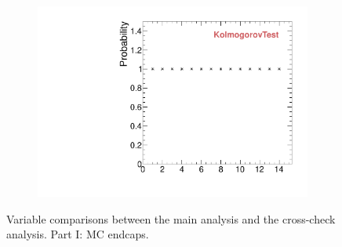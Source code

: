 \begin{figure}
\begin{subfigure}[b]{0.2\textwidth}
                \includegraphics[width=\textwidth]{Figures/VariablesComparison/MC_endcaps_figs/KS}
                \label{fig:MC_endcaps_KS}
        \end{subfigure}
        \caption{Variable comparisons between the main analysis and the cross-check analysis. Part I: MC endcaps.}
        \label{fig:MC_endcaps_figs}
\end{figure}


